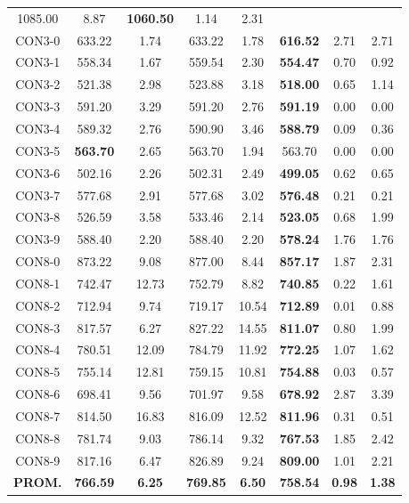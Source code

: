 \begin{table}[h]
\begin{tabular}{c c c c c c c c}
1085.00 & 8.87 & \bf{1060.50} & 
1.14 & 2.31\\CON3-0 & 633.22 & 1.74 & 
633.22 & 1.78 & \bf{616.52} & 
2.71 & 2.71\\CON3-1 & 558.34 & 1.67 & 
559.54 & 2.30 & \bf{554.47} & 
0.70 & 0.92\\CON3-2 & 521.38 & 2.98 & 
523.88 & 3.18 & \bf{518.00} & 
0.65 & 1.14\\CON3-3 & 591.20 & 3.29 & 
591.20 & 2.76 & \bf{591.19} & 
0.00 & 0.00\\CON3-4 & 589.32 & 2.76 & 
590.90 & 3.46 & \bf{588.79} & 
0.09 & 0.36\\CON3-5 & \bf{563.70} & 2.65 & 
563.70 & 1.94 & 563.70 & 0.00
 & 0.00\\
CON3-6 & 502.16 & 2.26 & 
502.31 & 2.49 & \bf{499.05} & 
0.62 & 0.65\\CON3-7 & 577.68 & 2.91 & 
577.68 & 3.02 & \bf{576.48} & 
0.21 & 0.21\\CON3-8 & 526.59 & 3.58 & 
533.46 & 2.14 & \bf{523.05} & 
0.68 & 1.99\\CON3-9 & 588.40 & 2.20 & 
588.40 & 2.20 & \bf{578.24} & 
1.76 & 1.76\\CON8-0 & 873.22 & 9.08 & 
877.00 & 8.44 & \bf{857.17} & 
1.87 & 2.31\\CON8-1 & 742.47 & 12.73 & 
752.79 & 8.82 & \bf{740.85} & 
0.22 & 1.61\\CON8-2 & 712.94 & 9.74 & 
719.17 & 10.54 & \bf{712.89} & 
0.01 & 0.88\\CON8-3 & 817.57 & 6.27 & 
827.22 & 14.55 & \bf{811.07} & 
0.80 & 1.99\\CON8-4 & 780.51 & 12.09 & 
784.79 & 11.92 & \bf{772.25} & 
1.07 & 1.62\\CON8-5 & 755.14 & 12.81 & 
759.15 & 10.81 & \bf{754.88} & 
0.03 & 0.57\\CON8-6 & 698.41 & 9.56 & 
701.97 & 9.58 & \bf{678.92} & 
2.87 & 3.39\\CON8-7 & 814.50 & 16.83 & 
816.09 & 12.52 & \bf{811.96} & 
0.31 & 0.51\\CON8-8 & 781.74 & 9.03 & 
786.14 & 9.32 & \bf{767.53} & 
1.85 & 2.42\\CON8-9 & 817.16 & 6.47 & 
826.89 & 9.24 & \bf{809.00} & 
1.01 & 2.21\\\bf{PROM.} & 
\bf{766.59} & \bf{6.25} & \bf{769.85} & \bf{6.50} & \bf{758.54} & \bf{0.98} & \bf{1.38}\\[1ex]\hline
\end{tabular}
\label{table:SS-M-100-0.5}
\end{table}


